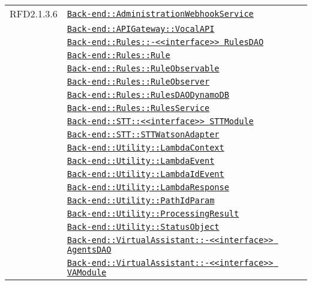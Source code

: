 \begin{longtable}{|>{\centering}m{3cm}|m{10cm}<{\centering}|}
RFD2.1.3.6 & \hyperref[Back-end::AdministrationWebhookService]{\texttt{Back-end::AdministrationWebhookService}}\\
& \hyperref[Back-end::APIGateway::VocalAPI]{\texttt{Back-end::APIGateway::VocalAPI}}\\
& \hyperref[Back-end::Rules::<<interface>> RulesDAO]{\texttt{Back-end::Rules::-\linebreak <<interface>> RulesDAO}}\\
& \hyperref[Back-end::Rules::Rule]{\texttt{Back-end::Rules::Rule}}\\
& \hyperref[Back-end::Rules::RuleObservable]{\texttt{Back-end::Rules::RuleObservable}}\\
& \hyperref[Back-end::Rules::RuleObserver]{\texttt{Back-end::Rules::RuleObserver}}\\
& \hyperref[Back-end::Rules::RulesDAODynamoDB]{\texttt{Back-end::Rules::RulesDAODynamoDB}}\\
& \hyperref[Back-end::Rules::RulesService]{\texttt{Back-end::Rules::RulesService}}\\
& \hyperref[Back-end::STT::<<interface>> STTModule]{\texttt{Back-end::STT::<<interface>> STTModule}}\\
& \hyperref[Back-end::STT::STTWatsonAdapter]{\texttt{Back-end::STT::STTWatsonAdapter}}\\
& \hyperref[Back-end::Utility::LambdaContext]{\texttt{Back-end::Utility::LambdaContext}}\\
& \hyperref[Back-end::Utility::LambdaEvent]{\texttt{Back-end::Utility::LambdaEvent}}\\
& \hyperref[Back-end::Utility::LambdaIdEvent]{\texttt{Back-end::Utility::LambdaIdEvent}}\\
& \hyperref[Back-end::Utility::LambdaResponse]{\texttt{Back-end::Utility::LambdaResponse}}\\
& \hyperref[Back-end::Utility::PathIdParam]{\texttt{Back-end::Utility::PathIdParam}}\\
& \hyperref[Back-end::Utility::ProcessingResult]{\texttt{Back-end::Utility::ProcessingResult}}\\
& \hyperref[Back-end::Utility::StatusObject]{\texttt{Back-end::Utility::StatusObject}}\\
& \hyperref[Back-end::VirtualAssistant::<<interface>> AgentsDAO]{\texttt{Back-end::VirtualAssistant::-\linebreak <<interface>> AgentsDAO}}\\
& \hyperref[Back-end::VirtualAssistant::<<interface>> VAModule]{\texttt{Back-end::VirtualAssistant::-\linebreak <<interface>> VAModule}}\\

\end{longtable}
